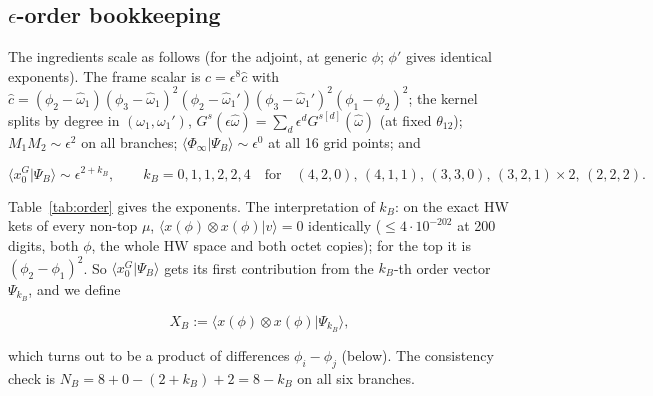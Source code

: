 \documentclass[11pt]{article}
\begin{document}
\subsection{\texorpdfstring{$\epsilon$}{}-order bookkeeping}\label{sec:bookkeeping}

The ingredients scale as follows (for the adjoint, at generic $\phi$; $\phi'$ gives identical exponents).
The frame scalar is $c=\epsilon^8\hat c$ with $\hat c=(\phi_2-\hat\omega_1)(\phi_3-\hat\omega_1)^2(\phi_2-\hat\omega_1')(\phi_3-\hat\omega_1')^2(\phi_1-\phi_2)^2$; the kernel splits by degree in $(\omega_1,\omega_1')$, $G^s(\epsilon\hat\omega)=\sum_d\epsilon^dG^{s[d]}(\hat\omega)$ (at fixed $\theta_{12}$); $M_1M_2\sim\epsilon^2$ on all branches; $\langle\Phi_\infty|\Psi_B\rangle\sim\epsilon^0$ at all 16 grid points; and

\begin{equation}
\langle x_0^G|\Psi_B\rangle\sim\epsilon^{2+k_B},\qquad k_B=0,1,1,2,2,4\quad\text{for}\quad(4,2,0),\,(4,1,1),\,(3,3,0),\,(3,2,1)\times2,\,(2,2,2).\label{eq:kB}
\end{equation}

Table~\ref{tab:order} gives the exponents.
The interpretation of $k_B$: on the exact HW kets of every non-top $\mu$, $\langle x(\phi)\otimes x(\phi)|v\rangle=0$ identically ($\le4\cdot10^{-202}$ at 200 digits, both $\phi$, the whole HW space and both octet copies); for the top it is $(\phi_2-\phi_1)^2$. So $\langle x_0^G|\Psi_B\rangle$ gets its first contribution from the $k_B$-th order vector $\Psi_{k_B}$, and we define

\begin{equation}
X_B:=\langle x(\phi)\otimes x(\phi)|\Psi_{k_B}\rangle,\label{eq:XB}
\end{equation}

which turns out to be a product of differences $\phi_i-\phi_j$ (below).
The consistency check is $N_B=8+0-(2+k_B)+2=8-k_B$ on all six branches.
\end{document}
